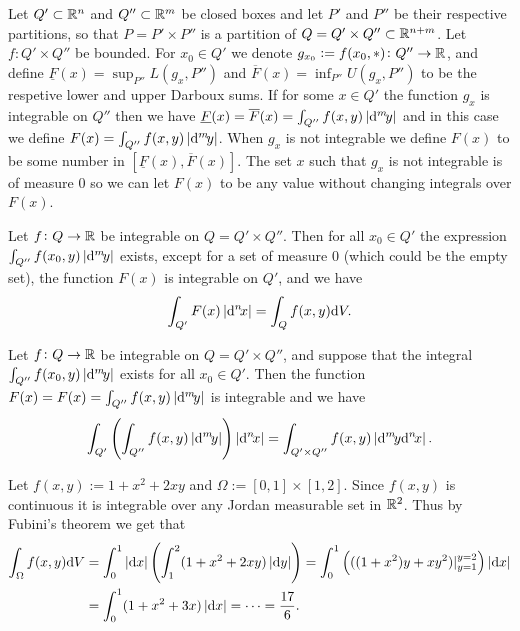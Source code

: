 \documentclass[11pt,a4paper]{article}
\begin{document}
\begin{remark}
  \label{rmk:fubini}
  Let $Q' \subset \mathbb{R}^n$ and $Q'' \subset \mathbb{R}^m$ be closed boxes
  and let $P'$ and $P''$ be their respective partitions,
  so that $P = P' \times P''$
  is a partition of $Q = Q' \times Q'' \subset \mathbb{R}^{n + m}$.
  Let $f \colon Q' \times Q''$ be bounded.
  For $x_0 \in Q'$ we denote $g_{x_0} := f(x_0,*) \colon Q'' \to \mathbb{R}$,
  and define $\underline F(x) = \sup_{P''} L(g_x,P'')$
  and $\overline F(x) = \inf_{P''} U(g_x,P'')$ to be the respetive
  lower and upper Darboux sums.
  If for some $x \in Q'$ the function $g_x$ is  integrable on $Q''$
  then
  we have $\underline F(x) = \overline F(x) = \int_{Q''} f(x,y) \abs{\dy[m]}$
  and in this case we define
  $F(x) = \int_{Q''} f(x,y) \abs{\dy[m]}$.
  When $g_x$ is not integrable we define $F(x)$ to be some number
  in $[\underline F(x),\overline F(x)]$.
  The set $x$ such that $g_x$ is not integrable is of measure $0$
  so we can let $F(x)$ to be any value without changing integrals
  over $F(x)$.

  Let $f \colon Q \to \mathbb{R}$ be integrable on $Q = Q' \times Q''$.
  Then for all $x_0 \in Q'$
  the expression $\int_{Q''} f(x_0,y) \abs{\dy[m]}$ exists,
  except for a set of measure $0$ (which could be the empty set),
  the function $F(x)$ is integrable on $Q'$, and we have
  \[
    \int_{Q'} F(x) \abs{\dx[n]} =
    \int_{Q} f(x,y) \dV.
  \]
\end{remark}
\begin{corollary}
  Let $f \colon Q \to \mathbb{R}$ be integrable on $Q = Q' \times Q''$,
  and suppose that the integral
  $\int_{Q''} f(x_0,y) \abs{\dy[m]}$ exists for all $x_0 \in Q'$.
  Then the function $F(x) = F(x) = \int_{Q''} f(x,y) \abs{\dy[m]}$
  is integrable and we have
  \[
    \int_{Q'} \del{\int_{Q''} f(x,y) \abs{\dy[m]}} \abs{\dx[n]} =
    \int_{Q' \times Q''} f(x,y) \abs{\dy[m] \dx[n]}.
  \]
\end{corollary}

\begin{example}
  Let $f(x,y) := 1 + x^2 + 2xy$ and $\Omega := [0,1] \times [1,2]$.
  Since $f(x,y)$ is continuous it is integrable over any Jordan
  measurable set in $\mathbb{R}^2$.
  Thus by Fubini's theorem we get that
  \begin{align*}
    \int_{\Omega} f(x,y) \dV &=
    \int_{0}^{1} \abs{\dx} \del{\int_{1}^{2} (1 + x^2 + 2xy) \abs{\dy}} =
    \int_{0}^{1} \del{((1 + x^2)y + xy^2)\vert^{y=2}_{y=1}} \abs{\dx} \\ &=
    \int_{0}^{1} (1 + x^2 + 3x) \abs{\dx} = \cdots = \frac{17}{6}.
  \end{align*}
\end{example}
\end{document}
